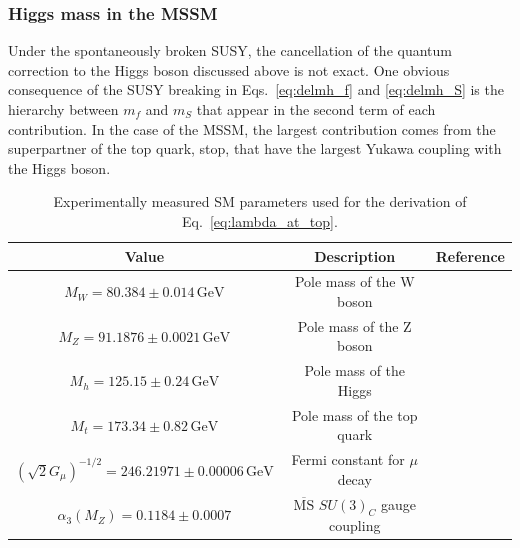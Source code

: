 \documentclass[12pt,twoside,book]{article}
\begin{document}
\subsubsection*{Higgs mass in the MSSM}

Under the spontaneously broken SUSY, the cancellation of the quantum correction to the Higgs boson discussed above is not exact.
One obvious consequence of the SUSY breaking in Eqs.~\eqref{eq:delmh_f} and \eqref{eq:delmh_S} is the hierarchy between $m_f$ and $m_S$ that appear in the second term of each contribution.
In the case of the MSSM, the largest contribution comes from the superpartner of the top quark, stop, that have the largest Yukawa coupling with the Higgs boson.

\begin{table}[t]
  \centering
  \begin{tabular}{ccc}
    Value & Description & Reference\\ \hline
    $M_W = 80.384 \pm 0.014\, \mathrm{GeV}$ & Pole mass of the W boson
      & \cite{Group:2012gb,Alcaraz:1016509} \\
    $M_Z = 91.1876 \pm 0.0021\, \mathrm{GeV}$ & Pole mass of the Z boson
      & \cite{Beringer:1900zz} \\
    $M_h = 125.15 \pm 0.24\, \mathrm{GeV}$ & Pole mass of the Higgs
      & \cite{Aad:2013wqa,Chatrchyan:2013mxa} \\
    $M_t = 173.34 \pm 0.82\, \mathrm{GeV}$ & Pole mass of the top quark
      & \cite{ATLAS:2014wva} \\
    $\left( \sqrt{2} G_\mu \right)^{-1/2} = 246.21971 \pm 0.00006\, \mathrm{GeV}$
      & Fermi constant for $\mu$ decay & \cite{Tishchenko:2012ie} \\
    $\alpha_3 (M_Z) = 0.1184 \pm 0.0007$
      & $\overline{\mathrm{MS}}$ $SU(3)_C$ gauge coupling & \cite{Bethke:2012jm}
  \end{tabular}
  \caption{Experimentally measured SM parameters used for the derivation of Eq.~\eqref{eq:lambda_at_top}.}
  \label{tab:SM_param}
\end{table}
\end{document}
